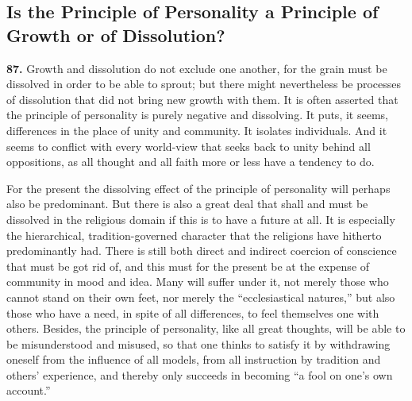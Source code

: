 \documentclass[12pt,a4paper]{book}
\begin{document}
\subsection{Is the Principle of Personality a Principle of
  Growth or of Dissolution?}
\label{ssec:pers-growth}

\noindent\textbf{87.} Growth and dissolution do not exclude one another, for the grain must be
dissolved in order to be able to sprout; but there might nevertheless be processes of dissolution
that did not bring new growth with them. It is often asserted that the principle of personality is
purely negative and dissolving. It puts, it seems, differences in the place of unity and
community. It isolates individuals. And it seems to conflict with every world-view that seeks back
to unity behind all oppositions, as all thought and all faith more or less have a tendency to do.

For the present the dissolving effect of the principle of personality will perhaps also be
predominant. But there is also a great deal that shall and must be dissolved in the religious domain
if this is to have a future at all. It is especially the hierarchical, tradition-governed character
that the religions have hitherto predominantly had. There is still both direct and indirect coercion
of conscience that must be got rid of, and this must for the present be at the expense of community
in mood and idea. Many will suffer under it, not merely those who cannot stand on their own feet,
nor merely the ``ecclesiastical natures,'' but also those who have a need, in spite of all
differences, to feel themselves one with others. Besides, the principle of personality, like all
great thoughts, will be able to be misunderstood and misused, so that one thinks to satisfy it by
withdrawing oneself from the influence of all models, from all instruction by tradition and others'
experience, and thereby only succeeds in becoming ``a fool on one's own account.''
\end{document}
